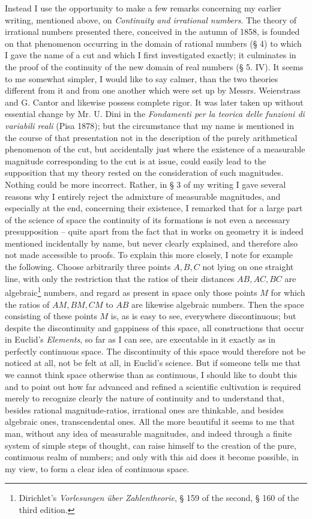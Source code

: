 \documentclass[11pt]{article}
\begin{document}
Instead I use the opportunity to make a few remarks concerning my earlier writing, mentioned above, on \emph{Continuity and irrational numbers}. The theory of irrational numbers presented there, conceived in the autumn of 1858, is founded on that phenomenon occurring in the domain of rational numbers (§ 4) to which I gave the name of a cut and which I first investigated exactly; it culminates in the proof of the continuity of the new domain of real numbers (§ 5. IV). It seems to me somewhat simpler, I would like to say calmer, than the two theories different from it and from one another which were set up by Messrs. Weierstrass and G. Cantor and likewise possess complete rigor. It was later taken up without essential change by Mr. U. Dini in the \emph{Fondamenti per la teorica delle funzioni di variabili reali} (Pisa 1878); but the circumstance that my name is mentioned in the course of that presentation not in the description of the purely arithmetical phenomenon of the cut, but accidentally just where the existence of a measurable magnitude corresponding to the cut is at issue, could easily lead to the supposition that my theory rested on the consideration of such magnitudes. Nothing could be more incorrect. Rather, in § 3 of my writing I gave several reasons why I entirely reject the admixture of measurable magnitudes, and especially at the end, concerning their existence, I remarked that for a large part of the science of space the continuity of its formations is not even a necessary presupposition -- quite apart from the fact that in works on geometry it is indeed mentioned incidentally by name, but never clearly explained, and therefore also not made accessible to proofs. To explain this more closely, I note for example the following. Choose arbitrarily three points $A,B,C$ not lying on one straight line, with only the restriction that the ratios of their distances $AB, AC, BC$ are algebraic\footnote{Dirichlet's \emph{Vorlesungen über Zahlentheorie}, § 159 of the second, § 160 of the third edition.} numbers, and regard as present in space only those points $M$ for which the ratios of $AM, BM, CM$ to $AB$ are likewise algebraic numbers. Then the space consisting of these points $M$ is, as is easy to see, everywhere discontinuous; but despite the discontinuity and gappiness of this space, all constructions that occur in Euclid's \emph{Elements}, so far as I can see, are executable in it exactly as in perfectly continuous space. The discontinuity of this space would therefore not be noticed at all, not be felt at all, in Euclid's science. But if someone tells me that we cannot think space otherwise than as continuous, I should like to doubt this and to point out how far advanced and refined a scientific cultivation is required merely to recognize clearly the nature of continuity and to understand that, besides rational magnitude-ratios, irrational ones are thinkable, and besides algebraic ones, transcendental ones. All the more beautiful it seems to me that man, without any idea of measurable magnitudes, and indeed through a finite system of simple steps of thought, can raise himself to the creation of the pure, continuous realm of numbers; and only with this aid does it become possible, in my view, to form a clear idea of continuous space.
\end{document}
